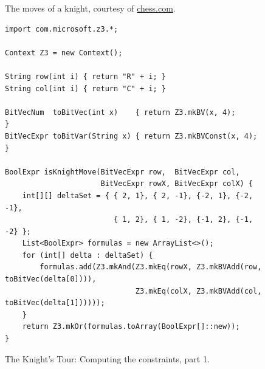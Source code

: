 \begin{figure}[!ht]
  \centering
  \caption{The moves of a knight, courtesy of \href{https://www.chess.com/}{chess.com}.}
  \label{fig:knight-moves.png}
\end{figure}

\begin{figure}[!ht]
\centering
\begin{verbatim}
import com.microsoft.z3.*;

Context Z3 = new Context();

String row(int i) { return "R" + i; }
String col(int i) { return "C" + i; }

BitVecNum  toBitVec(int x)    { return Z3.mkBV(x, 4);      }
BitVecExpr toBitVar(String x) { return Z3.mkBVConst(x, 4); }

BoolExpr isKnightMove(BitVecExpr row,  BitVecExpr col,
                      BitVecExpr rowX, BitVecExpr colX) {
    int[][] deltaSet = { { 2, 1}, { 2, -1}, {-2, 1}, {-2, -1},
                         { 1, 2}, { 1, -2}, {-1, 2}, {-1, -2} };
    List<BoolExpr> formulas = new ArrayList<>();
    for (int[] delta : deltaSet) {
        formulas.add(Z3.mkAnd(Z3.mkEq(rowX, Z3.mkBVAdd(row, toBitVec(delta[0]))),
                              Z3.mkEq(colX, Z3.mkBVAdd(col, toBitVec(delta[1])))));
    }
    return Z3.mkOr(formulas.toArray(BoolExpr[]::new));
}
\end{verbatim}
\vspace*{-0.3cm}
\caption{The Knight's Tour: Computing the constraints, part 1.}
\label{fig:Knight's Tour with Z3.ipynb-1}
\end{figure}

